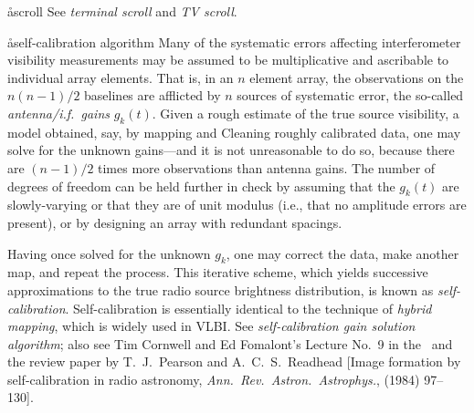 \aa{scroll} See {\it terminal scroll} and {\it TV scroll}.

\aa{self-calibration algorithm}
Many of the systematic errors affecting interferometer visibility
measurements may be assumed to be multiplicative and ascribable
to individual array elements.
That is, in an $n$ element array, the observations on the
$n(n-1)/2$ baselines are afflicted by $n$ sources of
systematic error, the so-called {\it antenna/i.f.\ gains} $g_k(t)$.
Given a rough estimate of the true source visibility, a model
obtained, say, by mapping and Cleaning roughly calibrated data,
one may solve for the unknown gains---and it is not unreasonable
to do so, because there are $(n-1)/2$ times more observations
than antenna gains.
The number of degrees of freedom can be held further in check
by assuming that the $g_k(t)$ are slowly-varying or that
they are of unit modulus (i.e., that no amplitude errors are
present), or by designing an array with redundant spacings.
\par
Having once solved for the unknown $g_k$, one may correct the
data, make another map, and repeat the process.
This iterative scheme, which yields successive approximations
to the true radio source brightness distribution, is known as
{\it self-calibration}.
Self-calibration is essentially identical to the technique of
{\it hybrid mapping}, which is widely used in VLBI.
See {\it self-calibration gain solution algorithm}; also see Tim Cornwell
and Ed Fomalont's
Lecture No.~9 in the \sira\ and the review paper by T.~J.~Pearson
and A.~C.~S.~Readhead [Image formation by self-calibration in radio
astronomy, {\it Ann.\ Rev.\ Astron.\ Astrophys.},  (1984)
97--130].

